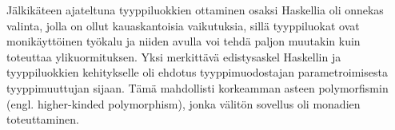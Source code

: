 \documentclass[finnish]{tktltiki2}
\begin{document}
Jälkikäteen ajateltuna tyyppiluokkien ottaminen osaksi Haskellia oli onnekas valinta, jolla on ollut kauaskantoisia vaikutuksia, sillä tyyppiluokat ovat monikäyttöinen työkalu ja niiden avulla voi tehdä paljon muutakin kuin toteuttaa ylikuormituksen. Yksi merkittävä edistysaskel Haskellin ja tyyppiluokkien kehitykselle oli ehdotus tyyppimuodostajan parametroimisesta tyyppimuuttujan sijaan. Tämä mahdollisti korkeamman asteen polymorfismin (engl. higher-kinded polymorphism), jonka välitön sovellus oli monadien toteuttaminen.





\end{document}
